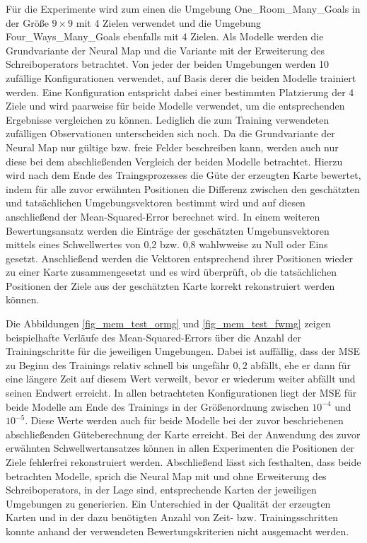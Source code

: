 Für die Experimente wird zum einen die Umgebung \glqq One\_Room\_Many\_Goals\grqq{} in der Größe $9 \times 9$ mit 4 Zielen verwendet und die Umgebung \glqq Four\_Ways\_Many\_Goals\grqq{} ebenfalls mit 4 Zielen. Als Modelle werden die Grundvariante der Neural Map und die Variante mit der Erweiterung des Schreiboperators betrachtet. Von jeder der beiden Umgebungen werden 10 zufällige Konfigurationen verwendet, auf Basis derer die beiden Modelle trainiert werden. Eine Konfiguration entspricht dabei einer bestimmten Platzierung der 4 Ziele und wird paarweise für beide Modelle verwendet, um die entsprechenden Ergebnisse vergleichen zu können. Lediglich die zum Training verwendeten zufälligen Observationen unterscheiden sich noch. Da die Grundvariante der Neural Map nur gültige bzw. freie Felder beschreiben kann, werden auch nur diese bei dem abschließenden Vergleich der beiden Modelle betrachtet. Hierzu wird nach dem Ende des Traingsprozesses die Güte der erzeugten Karte bewertet, indem für alle zuvor erwähnten Positionen die Differenz zwischen den geschätzten und tatsächlichen Umgebungsvektoren bestimmt wird und auf diesen anschließend der Mean-Squared-Error berechnet wird. In einem weiteren Bewertungsansatz werden die Einträge der geschätzten Umgebunsvektoren mittels eines Schwellwertes von 0,2 bzw. 0,8 wahlwweise zu Null oder Eins gesetzt. Anschließend werden die Vektoren entsprechend ihrer Positionen wieder zu einer Karte zusammengesetzt und es wird überprüft, ob die tatsächlichen Positionen der Ziele aus der geschätzten Karte korrekt rekonstruiert werden können.

Die Abbildungen \ref{fig_mem_test_ormg} und \ref{fig_mem_test_fwmg} zeigen beispielhafte Verläufe des Mean-Squared-Errors über die Anzahl der Trainingschritte für die jeweiligen Umgebungen. Dabei ist auffällig, dass der MSE zu Beginn des Trainings relativ schnell bis ungefähr $0,2$ abfällt, ehe er dann für eine längere Zeit auf diesem Wert verweilt, bevor er wiederum weiter abfällt und seinen Endwert erreicht. In allen betrachteten Konfigurationen liegt der MSE für beide Modelle am Ende des Trainings in der Größenordnung zwischen $10^{-4}$ und $10^{-5}$. Diese Werte werden auch für beide Modelle bei der zuvor beschriebenen abschließenden Güteberechnung der Karte erreicht. Bei der Anwendung des zuvor erwähnten Schwellwertansatzes können in allen Experimenten die Positionen der Ziele fehlerfrei rekonstruiert werden. Abschließend lässt sich festhalten, dass beide betrachten Modelle, sprich die Neural Map mit und ohne Erweiterung des Schreiboperators, in der Lage sind, entsprechende Karten der jeweiligen Umgebungen zu generierien. Ein Unterschied in der Qualität der erzeugten Karten und in der dazu benötigten Anzahl von Zeit- bzw. Trainingsschritten konnte anhand der verwendeten Bewertungskriterien nicht ausgemacht werden.


